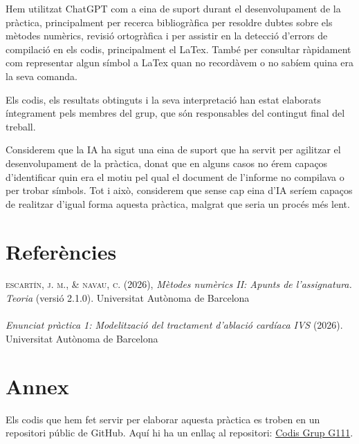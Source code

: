 \documentclass[a4paper,11pt,oneside]{article}
\begin{document}
Hem utilitzat ChatGPT com a eina de suport durant el desenvolupament de la pràctica, principalment per 
recerca bibliogràfica per resoldre dubtes sobre els mètodes numèrics, revisió ortogràfica i per assistir en la detecció d'errors 
de compilació en els codis, principalment el LaTex. També per consultar ràpidament com representar algun símbol a LaTex quan no 
recordàvem o no sabíem quina era la seva comanda.

Els codis, els resultats obtinguts i la seva interpretació han estat elaborats íntegrament pels membres del grup, que són responsables del 
contingut final del treball. 

Considerem que la IA ha sigut una eina de suport que ha servit per agilitzar el desenvolupament de la pràctica, donat que en 
alguns casos no érem capaços d'identificar quin era el motiu pel qual el document de l'informe no compilava o per trobar símbols. 
Tot i això, considerem que sense cap eina d'IA seríem capaços de realitzar d'igual forma aquesta pràctica, malgrat que seria un 
procés més lent.





\newpage

\section{Referències}
\textsc{escartín, j. m., \& navau, c.} (2026),
\textit{Mètodes numèrics II: Apunts de l'assignatura. Teoria} (versió 2.1.0). Universitat Autònoma de Barcelona
\\
\\
\textit{Enunciat pràctica 1: Modelització del tractament d'ablació cardíaca IVS} (2026). Universitat Autònoma de Barcelona

\section{Annex}
Els codis que hem fet servir per elaborar aquesta pràctica es troben en un repositori públic de GitHub. Aquí hi ha un enllaç 
al repositori: \color{blue} \href{https://github.com/Victor-sli/Codis-practica1-Grup-G111}{Codis Grup G111}. \color{black}
\end{document}
